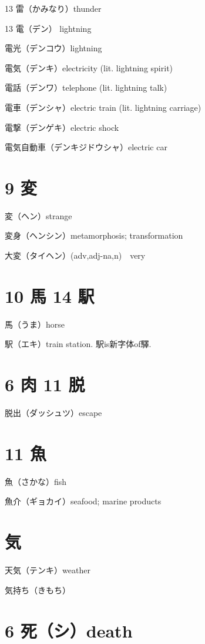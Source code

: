 13 雷（かみなり）thunder

13 電（デン） lightning

電光（デンコウ）lightning

電気（デンキ）electricity (lit. lightning spirit)

電話（デンワ）telephone (lit. lightning talk)

電車（デンシャ）electric train (lit. lightning carriage)

電撃（デンゲキ）electric shock

電気自動車（デンキジドウシャ）electric car

\section{9 変}

変（ヘン）strange

変身（ヘンシン）metamorphosis; transformation

大変（タイヘン）(adv,adj-na,n)　very

\section{10 馬 14 駅}

馬（うま）horse

駅（エキ）train station. 駅is新字体of驛.

\section{6 肉 11 脱}

脱出（ダッシュツ）escape

\section{11 魚}

魚（さかな）fish

魚介（ギョカイ）seafood; marine products

\section{気}

天気（テンキ）weather

気持ち（きもち）

\section{6 死（シ）death}

